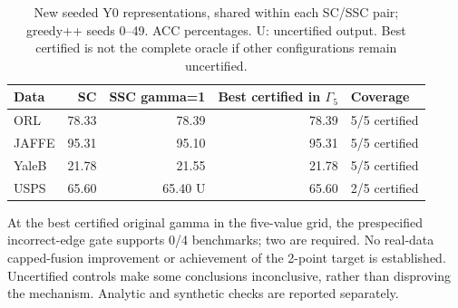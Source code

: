 \begin{table}[t]
\centering\small
\caption{New seeded Y0 representations, shared within each SC/SSC pair; greedy++ seeds 0--49. ACC percentages. U: uncertified output. Best certified is not the complete oracle if other configurations remain uncertified.}
\label{tab:mechanism}
\begin{tabular}{lrrrl}
\toprule Data & SC & SSC gamma=1 & Best certified in $\Gamma_5$ & Coverage \\
\midrule
ORL & 78.33 & 78.39 & 78.39 & 5/5 certified \\
JAFFE & 95.31 & 95.10 & 95.31 & 5/5 certified \\
YaleB & 21.78 & 21.55 & 21.78 & 5/5 certified \\
USPS & 65.60 & 65.40 U & 65.60 & 2/5 certified \\
\bottomrule\end{tabular}
\end{table}
At the best certified original gamma in the five-value grid, the prespecified incorrect-edge gate supports 0/4 benchmarks; two are required. No real-data capped-fusion improvement or achievement of the 2-point target is established. Uncertified controls make some conclusions inconclusive, rather than disproving the mechanism. Analytic and synthetic checks are reported separately.

